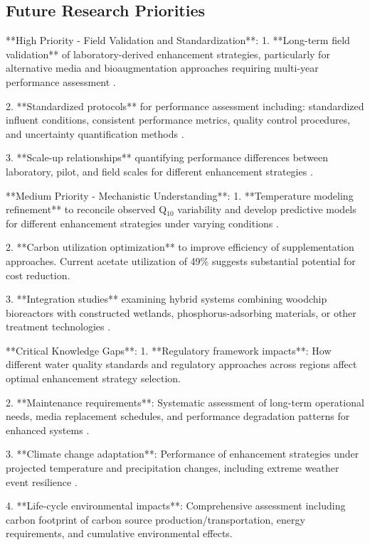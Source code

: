 \documentclass[12pt,a4paper]{article}
\begin{document}
\subsection{Future Research Priorities}

**High Priority - Field Validation and Standardization**:
1. **Long-term field validation** of laboratory-derived enhancement strategies, particularly for alternative media and bioaugmentation approaches requiring multi-year performance assessment \citep{RN629}.

2. **Standardized protocols** for performance assessment including: standardized influent conditions, consistent performance metrics, quality control procedures, and uncertainty quantification methods \citep{RN310}.

3. **Scale-up relationships** quantifying performance differences between laboratory, pilot, and field scales for different enhancement strategies \citep{RN312}.

**Medium Priority - Mechanistic Understanding**:
1. **Temperature modeling refinement** to reconcile observed Q$_{10}$ variability and develop predictive models for different enhancement strategies under varying conditions \citep{RN242, RN258}.

2. **Carbon utilization optimization** to improve efficiency of supplementation approaches. Current acetate utilization of 49\% \citep{RN242} suggests substantial potential for cost reduction.

3. **Integration studies** examining hybrid systems combining woodchip bioreactors with constructed wetlands, phosphorus-adsorbing materials, or other treatment technologies \citep{RN625}.

**Critical Knowledge Gaps**:
1. **Regulatory framework impacts**: How different water quality standards and regulatory approaches across regions affect optimal enhancement strategy selection.

2. **Maintenance requirements**: Systematic assessment of long-term operational needs, media replacement schedules, and performance degradation patterns for enhanced systems \citep{RN629}.

3. **Climate change adaptation**: Performance of enhancement strategies under projected temperature and precipitation changes, including extreme weather event resilience \citep{RN1181}.

4. **Life-cycle environmental impacts**: Comprehensive assessment including carbon footprint of carbon source production/transportation, energy requirements, and cumulative environmental effects.
\end{document}
